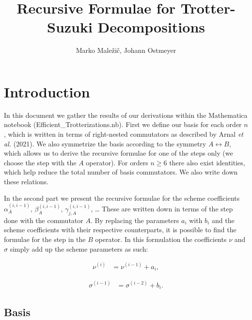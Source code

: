 \documentclass[12pt]{article}
\author{Marko Maležič, Johann Ostmeyer}
\title{Recursive Formulae for Trotter-Suzuki Decompositions}
\begin{document}
\vfill
\maketitle
\vfill

\section*{Introduction}

In this document we gather the results of our derivations within the Mathematica notebook (Efficient\_Trotterizations.nb).
First we define our basis for each order $n$, which is written in terms of right-nested commutators as described by Arnal \textit{et al.} (2021).
We also symmetrize the basis according to the symmetry $A \leftrightarrow B$, which allows us to derive the recursive formulae for one of the steps only (we choose the step with the $A$ operator).
For orders $n \geq 6$ there also exist identities, which help reduce the total number of basis commutators.
We also write down these relations.

In the second part we present the recursive formulae for the scheme coefficients $\alpha_{A}^{(i, i-1)}$, $\beta_{A}^{(i, i-1)}$, $\gamma_{j, A}^{(i, i-1)}$, \ldots
These are written down in terms of the step done with the commutator $A$.
By replacing the parameters $a_{i}$ with $b_{i}$ and the scheme coefficients with their respective counterparts, it is possible to find the formulae for the step in the $B$ operator.
In this formulation the coefficients $\nu$ and $\sigma$ simply add up the scheme parameters as such:

\begin{equation}
  \begin{aligned}
    \nu^{(i)} &= \nu^{(i-1)} + a_{i},
  \end{aligned}
\end{equation}

\begin{equation}
  \begin{aligned}
    \sigma^{(i-1)} &= \sigma^{(i-2)} + b_{i}.
  \end{aligned}
\end{equation}

\vfill

\newpage

\subsection*{Basis}
\end{document}
